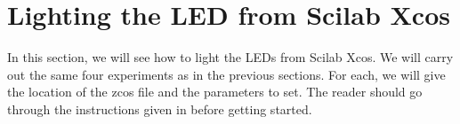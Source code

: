 \begin{scicode}
\label{sci:led-blue-red}

\end{scicode}

\begin{scicode}
\label{sci:led-green-blink}

\end{scicode}


\section{Lighting the LED from Scilab Xcos}
\label{sec:light-xcos}
In this section, we will see how to light the LEDs from Scilab Xcos.
We will carry out the same four experiments as in the previous
sections.  For each, we will give the location
of the zcos file and the parameters to set.  The reader should go
through the instructions given in  before
getting started.

